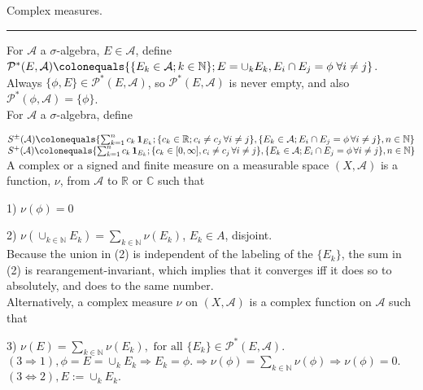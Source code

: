 \documentclass[12pt]{article}
\newcommand{\partset}[1]{ \mathcal{P}^{*}(#1) }
\newcommand{\fall}[0] { \textrm{ for all } }
\newcommand{\rimply}[0] { \Rightarrow }
\newcommand{\lrimply}[0] { \Leftrightarrow }
\newcommand{ \defeq }[0] { \colonequals }
\newcommand{ \cf }[1] { \mathbf{1}_{#1} }
\newcommand{\nats}[0] { \mathbb{N}}
\newcommand{\reals}[0] { \mathbb{R}}
\newcommand{\cmplxs}[0] { \mathbb{C}}
\newcommand{\A}[0] { \mathcal{A} }
\begin{document}
\break

\begin{flushleft}
Complex measures. \\
\end{flushleft}

\begin{flushleft}
\addvspace{5pt} \hrule
\end{flushleft}	

For $\A$ a $\sigma$-algebra, $E \in \A$, define $\partset{E, \A} \defeq \{ \{ E_k \in \A; k \in \nats \}; E = \cup_k E_k, E_i \cap E_j = \phi \;  \forall i \not = j \}$. Always $ \{ \phi, E \} \in \partset{E, \A}$, so $\partset{E, \A}$ is never empty, and also $\partset{\phi, \A} = \{ \phi \}$.    \\

For $\A$ a $\sigma$-algebra, define 


\noindent
$S^\pm(\A) \defeq \{ \sum_{k=1}^n c_k \, \cf{E_k}; \{c_k \in\reals; c_i \not = c_j \, \forall i \not = j\}, \{E_k \in \A; E_i \cap E_j = \phi \, \forall i \not = j \}, n \in \nats \}$ \\
\noindent
$S^{+}(\A) \defeq \{ \sum_{k=1}^n c_k \, \cf{E_k}; \{c_k \in [0, \infty], c_i \not = c_j \, \forall i \not = j\}, \{E_k \in \A; E_i \cap E_j = \phi \, \forall i \not = j \}, n \in \nats \}$ \\



A complex or a signed and finite measure on a measurable space $(X,\A)$ is a function, $\nu$, from $\A$ to $\reals$ or $\cmplxs$ such that

1) $\nu(\phi) = 0$

2) $\nu( \cup_{k\in \nats} E_k ) = \sum_{k \in \nats} \nu(E_k) $, $E_k \in A$, disjoint.  \\

Because the union in (2) is independent of the labeling of the $\{ E_k \}$, the sum in (2) is rearangement-invariant, which implies that it converges iff it does so to absolutely, and does to the same number. \\

Alternatively, a complex measure $\nu$ on $(X,\A)$ is a complex function on $\A$ such that

3) $\nu(E) = \sum_{k \in \nats} \nu(E_k), \fall \{ E_k\} \in \partset{E, \A}$.\\

$(3 \rimply 1), \phi = E = \cup_k E_k \rimply E_k = \phi. \rimply \nu(\phi) = \sum_{k \in \nats } \nu(\phi) \rimply \nu(\phi) = 0.$ $(3 \lrimply 2), E := \cup_k E_k.$ \\
\end{document}
